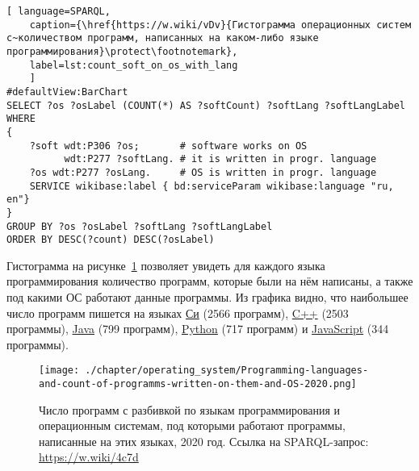 % 
\begin{lstlisting}[ language=SPARQL, 
	caption={\href{https://w.wiki/vDv}{Гистограмма операционных систем с~количеством программ, написанных на каком-либо языке программирования}\protect\footnotemark},
	label=lst:count_soft_on_os_with_lang
	]
#defaultView:BarChart
SELECT ?os ?osLabel (COUNT(*) AS ?softCount) ?softLang ?softLangLabel WHERE
{
    ?soft wdt:P306 ?os;       # software works on OS
          wdt:P277 ?softLang. # it is written in progr. language
    ?os wdt:P277 ?osLang.     # OS is written in progr. language
    SERVICE wikibase:label { bd:serviceParam wikibase:language "ru, en"}
}
GROUP BY ?os ?osLabel ?softLang ?softLangLabel
ORDER BY DESC(?count) DESC(?osLabel)
\end{lstlisting}



\newpage
Гистограмма на рисунке~\ref{fig:count-software-written-on-languages} позволяет увидеть для каждого языка программирования количество программ, которые были на нём написаны, а также под какими ОС работают данные программы. Из графика видно, что наибольшее число программ пишется на языках \href{https://www.wikidata.org/wiki/Q15777}{Си} (2566 программ), \href{https://www.wikidata.org/wiki/Q2407}{C++} (2503 программы), \href{https://www.wikidata.org/wiki/Q251}{Java} (799 программ), \href{https://www.wikidata.org/wiki/Q28865}{Python} (717 программ) и \href{https://www.wikidata.org/wiki/Q2005}{JavaScript} (344 программы).

\begin{figure}[h]
	\texttt{[image: ./chapter/operating\_system/Programming-languages-and-count-of-programms-written-on-them-and-OS-2020.png]}
    \caption[Число программ с разбивкой по языкам и ОС, 2020 год.]{Число программ с разбивкой по языкам программирования и операционным системам, под которыми работают программы, написанные на этих языках, 2020 год. Ссылка на SPARQL-запрос: \href{https://w.wiki/4c7d}{https://w.wiki/4c7d}}
	\label{fig:count-software-written-on-languages}
\end{figure}

